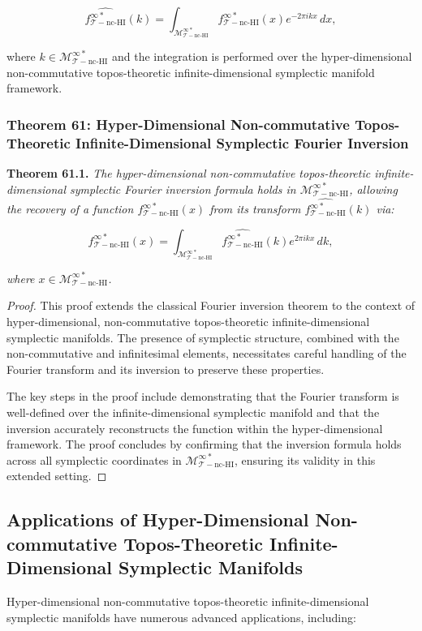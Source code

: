 \documentclass{article}
\begin{document}
\[
\widehat{f_{\mathcal{T}-\text{nc-HI}}^{\infty *}}(k) = \int_{\mathcal{M}_{\mathcal{T}-\text{nc-HI}}^{\infty *}} f_{\mathcal{T}-\text{nc-HI}}^{\infty *}(x) e^{-2\pi i k x} \, dx,
\]

where \(k \in \mathcal{M}_{\mathcal{T}-\text{nc-HI}}^{\infty *}\) and the integration is performed over the hyper-dimensional non-commutative topos-theoretic infinite-dimensional symplectic manifold framework.

\subsubsection{Theorem 61: Hyper-Dimensional Non-commutative Topos-Theoretic Infinite-Dimensional Symplectic Fourier Inversion}
\textbf{Theorem 61.1.} \textit{The hyper-dimensional non-commutative topos-theoretic infinite-dimensional symplectic Fourier inversion formula holds in \(\mathcal{M}_{\mathcal{T}-\text{nc-HI}}^{\infty *}\), allowing the recovery of a function \(f_{\mathcal{T}-\text{nc-HI}}^{\infty *}(x)\) from its transform \(\widehat{f_{\mathcal{T}-\text{nc-HI}}^{\infty *}}(k)\) via:}

\[
f_{\mathcal{T}-\text{nc-HI}}^{\infty *}(x) = \int_{\mathcal{M}_{\mathcal{T}-\text{nc-HI}}^{\infty *}} \widehat{f_{\mathcal{T}-\text{nc-HI}}^{\infty *}}(k) e^{2\pi i k x} \, dk,
\]

\textit{where \(x \in \mathcal{M}_{\mathcal{T}-\text{nc-HI}}^{\infty *}\).}

\begin{proof}
This proof extends the classical Fourier inversion theorem to the context of hyper-dimensional, non-commutative topos-theoretic infinite-dimensional symplectic manifolds. The presence of symplectic structure, combined with the non-commutative and infinitesimal elements, necessitates careful handling of the Fourier transform and its inversion to preserve these properties.

The key steps in the proof include demonstrating that the Fourier transform is well-defined over the infinite-dimensional symplectic manifold and that the inversion accurately reconstructs the function within the hyper-dimensional framework. The proof concludes by confirming that the inversion formula holds across all symplectic coordinates in \(\mathcal{M}_{\mathcal{T}-\text{nc-HI}}^{\infty *}\), ensuring its validity in this extended setting.
\end{proof}

\subsection{Applications of Hyper-Dimensional Non-commutative Topos-Theoretic Infinite-Dimensional Symplectic Manifolds}
Hyper-dimensional non-commutative topos-theoretic infinite-dimensional symplectic manifolds have numerous advanced applications, including:
\end{document}
